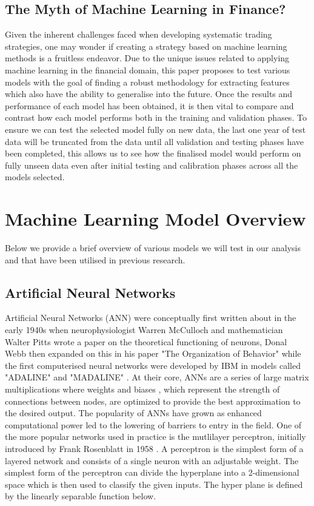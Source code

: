 \documentclass[11pt, a4paper]{article}
\begin{document}
\subsection{The Myth of Machine Learning in Finance?}
Given the inherent challenges faced when developing systematic trading strategies, one may wonder if creating a strategy based on machine learning methods is a fruitless endeavor.
\newline Due to the unique issues related to applying machine learning in the financial domain, this paper proposes to test various models with the goal of finding a robust methodology for extracting features which also have the ability to generalise into the future. Once the results and performance of each model has been obtained, it is then vital to compare and contrast how each model performs both in the training and validation phases. \newline To ensure we can test the selected model fully  on new data, the last one year of test data will be truncated from the data until all validation and testing phases have been completed, this allows us to see how the finalised model would perform on fully unseen data even after initial testing and calibration phases across all the models selected.

\section{Machine Learning Model Overview}
 Below we provide a brief overview of various models we will test in our analysis and that have been utilised in previous research.

\subsection{Artificial Neural Networks}
Artificial Neural Networks (ANN) were conceptually first written about in the early 1940s \cite{Widrow1990} when neurophysiologist Warren McCulloch and mathematician Walter Pitts wrote a paper on the theoretical functioning of neurons, Donal Webb then expanded on this in his paper "The Organization of Behavior" while the first computerised neural networks were developed by IBM in models called "ADALINE" and "MADALINE" \cite{Widrow1990} . At their core, ANNs are a series of large matrix multiplications where weights and biases , which represent the strength of connections between nodes, are optimized to provide the best approximation to the desired output. The popularity of ANNs have grown as enhanced computational power led to the lowering of barriers to entry in the field. One of the more popular networks used in practice is the mutlilayer perceptron, initially introduced by Frank Rosenblatt in 1958 \cite{Rosenblatt1958}. A perceptron is the simplest form of a layered network and consists of a single neuron with an adjustable weight. The simplest form of the perceptron can divide the hyperplane into a 2-dimensional space which is then used to classify the given inputs. The hyper plane is defined by the linearly separable function below.
\end{document}
